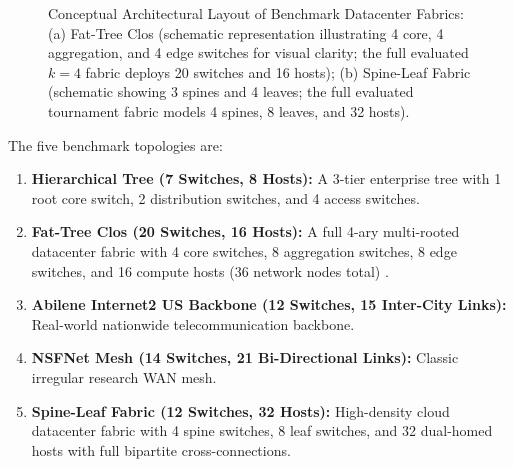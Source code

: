 \documentclass[12pt,a4paper,oneside]{report}
\begin{document}
\begin{figure}[htbp]
\caption{Conceptual Architectural Layout of Benchmark Datacenter Fabrics: (a) Fat-Tree Clos (schematic representation illustrating 4 core, 4 aggregation, and 4 edge switches for visual clarity; the full evaluated $k=4$ fabric deploys 20 switches and 16 hosts); (b) Spine-Leaf Fabric (schematic showing 3 spines and 4 leaves; the full evaluated tournament fabric models 4 spines, 8 leaves, and 32 hosts).}
\label{fig:benchmark_topos}
\end{figure}

The five benchmark topologies are:
\begin{enumerate}
    \item \textbf{Hierarchical Tree (7 Switches, 8 Hosts):} A 3-tier enterprise tree with 1 root core switch, 2 distribution switches, and 4 access switches.
    \item \textbf{Fat-Tree Clos (20 Switches, 16 Hosts):} A full 4-ary multi-rooted datacenter fabric with 4 core switches, 8 aggregation switches, 8 edge switches, and 16 compute hosts (36 network nodes total) \cite{al2008scalable}.
    \item \textbf{Abilene Internet2 US Backbone (12 Switches, 15 Inter-City Links):} Real-world nationwide telecommunication backbone.
    \item \textbf{NSFNet Mesh (14 Switches, 21 Bi-Directional Links):} Classic irregular research WAN mesh.
    \item \textbf{Spine-Leaf Fabric (12 Switches, 32 Hosts):} High-density cloud datacenter fabric with 4 spine switches, 8 leaf switches, and 32 dual-homed hosts with full bipartite cross-connections.
\end{enumerate}
\end{document}
